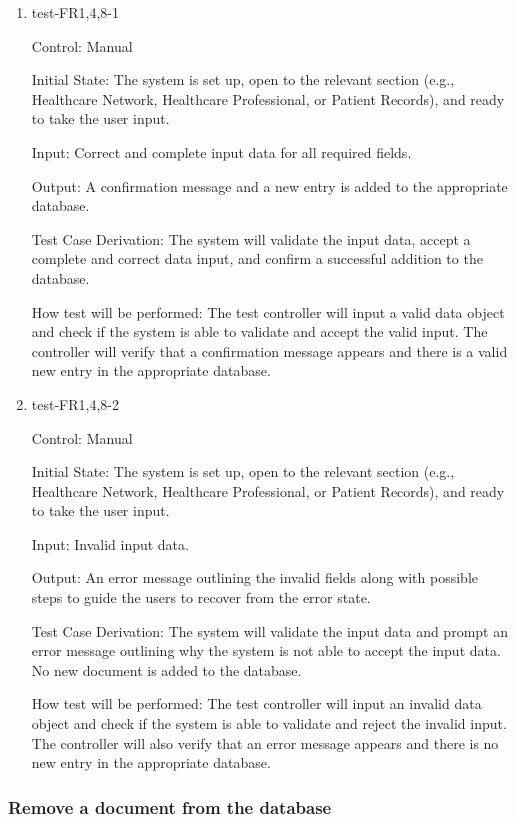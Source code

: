 \documentclass[12pt, titlepage]{article}
\begin{document}
\begin{enumerate}

\item{test-FR1,4,8-1} \label{test-FR1,4,8-1}

Control: Manual

Initial State: The system is set up, open to the relevant section (e.g., Healthcare Network, Healthcare Professional, or Patient Records), and ready to take the user input.

Input: Correct and complete input data for all required fields.

Output: A confirmation message and a new entry is added to the appropriate database.

Test Case Derivation: The system will validate the input data, accept a complete and correct data input, and confirm a successful addition to the database.

How test will be performed: The test controller will input a valid data object and check if the system is able to validate and accept the valid input. The controller will verify that a confirmation message appears and there is a valid new entry in the appropriate database.

					
\item{test-FR1,4,8-2} \label{test-FR1,4,8-2}

Control: Manual
					
Initial State: The system is set up, open to the relevant section (e.g., Healthcare Network, Healthcare Professional, or Patient Records), and ready to take the user input.

Input: Invalid input data.

Output: An error message outlining the invalid fields along with possible steps to guide the users to recover from the error state.

Test Case Derivation: The system will validate the input data and prompt an error message outlining why the system is not able to accept the input data. No new document is added to the database.

How test will be performed: The test controller will input an invalid data object and check if the system is able to validate and reject the invalid input. The controller will also verify that an error message appears and there is no new entry in the appropriate database.

\end{enumerate}


\subsubsection{Remove a document from the database} \label{section:4.1.2}
\end{document}
